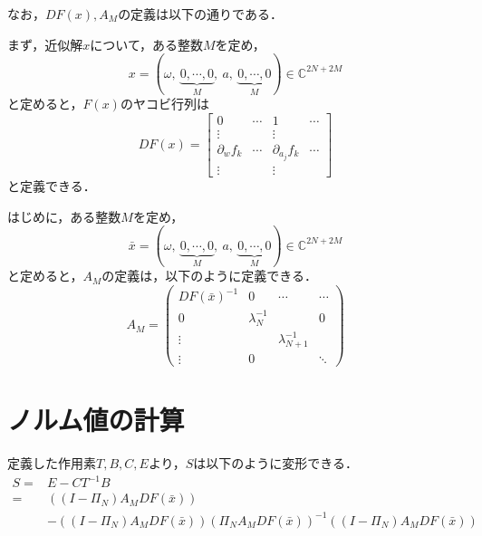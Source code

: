 なお，$DF(x), A_M$の定義は以下の通りである．
\begin{dfn}[拡張したヤコビ行列$DF(x)$]
  \label{dfn:拡張したヤコビ行列}
  まず，近似解$x$について，ある整数$M$を定め，
  \begin{equation}
    x = (\omega,\ \underbrace{0,\cdots,0}_{M},\ a,\ \underbrace{0,\cdots,0}_{M}) \in \mathbb{C}^{2N+2M}
  \end{equation}
  と定めると，$F(x)$のヤコビ行列は
  \begin{equation}
    DF(x) = \left[
      \begin{array}{c|ccc}
        0 & \cdots & 1 & \cdots \\ \hline
        \vdots & & \vdots &  \\
        \partial_w f_k & \cdots & \partial_{a_j}f_k & \cdots \\
        \vdots & & \vdots &
      \end{array}
    \right] %
  \end{equation}
  と定義できる．
\end{dfn}
\begin{dfn}
  \label{dfn:作用素AM}
  はじめに，ある整数$M$を定め，
  \begin{equation}
    \bar{x} = (\omega,\ \underbrace{0,\cdots,0}_{M},\ a,\ \underbrace{0,\cdots,0}_{M}) \in \mathbb{C}^{2N+2M}
  \end{equation}
  と定めると，$A_M$の定義は，以下のように定義できる．
  \begin{equation*}
    A_M = \left(
    \begin{array}{c|ccc}
      DF(\bar{x})^{-1} & 0 & \cdots & \cdots \\ \hline
      0 & \lambda_N^{-1} &  & 0 \\
      \vdots &  & \lambda_{N+1}^{-1} &  \\
      \vdots & 0 &   & \ddots
    \end{array}
    \right)
  \end{equation*}
\end{dfn}


\section{ノルム値の計算}

定義した作用素$T,B,C,E$より，$S$は以下のように変形できる．
\begin{equation}
  \begin{split}
    S =& E-CT^{-1}B \\
    =& \left( \left( I-\Pi_N \right) A_M DF ( \bar{x} ) \right)\\
    &- (\left( I-\Pi_N \right) A_M DF( \bar{x} )) (\Pi_N A_M DF(\bar{x}))^{-1} ((I-\Pi_N)A_M DF(\bar{x}))
  \end{split}
  \label{eq:s-def}
\end{equation}

